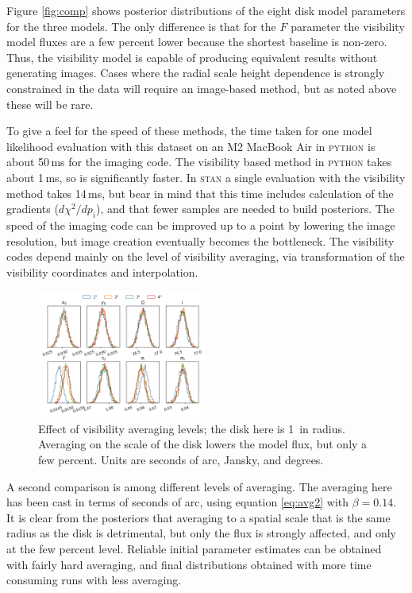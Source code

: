 \documentclass[fleqn,usenatbib]{mnras}
\begin{document}
Figure \ref{fig:comp} shows posterior distributions of the eight disk model parameters for the three models. The only difference is that for the $F$ parameter the visibility model fluxes are a few percent lower because the shortest baseline is non-zero. Thus, the visibility model is capable of producing equivalent results without generating images. Cases where the radial scale height dependence is strongly constrained in the data will require an image-based method, but as noted above these will be rare.

To give a feel for the speed of these methods, the time taken for one model likelihood evaluation with this dataset on an M2 MacBook Air in \textsc{python} is about 50\,ms for the imaging code. The visibility based method in \textsc{python} takes about 1\,ms, so is significantly faster. In \textsc{stan} a single evaluation with the visibility method takes 14\,ms, but bear in mind that this time includes calculation of the gradients ($d \chi^2 / dp_i$), and that fewer samples are needed to build posteriors. The speed of the imaging code can be improved up to a point by lowering the image resolution, but image creation eventually becomes the bottleneck. The visibility codes depend mainly on the level of visibility averaging, via transformation of the visibility coordinates and interpolation.

\begin{figure}
    \centering
    \includegraphics[width=0.5\textwidth]{avg.png}
    \caption{Effect of visibility averaging levels; the disk here is 1\arcsec~in radius. Averaging on the scale of the disk lowers the model flux, but only a few percent. Units are seconds of arc, Jansky, and degrees.}
    \label{fig:avg}
\end{figure}

A second comparison is among different levels of averaging. The averaging here has been cast in terms of seconds of arc, using equation \ref{eq:avg2} with $\beta=0.14$. It is clear from the posteriors that averaging to a spatial scale that is the same radius as the disk is detrimental, but only the flux is strongly affected, and only at the few percent level. Reliable initial parameter estimates can be obtained with fairly hard averaging, and final distributions obtained with more time consuming runs with less averaging.
\end{document}
